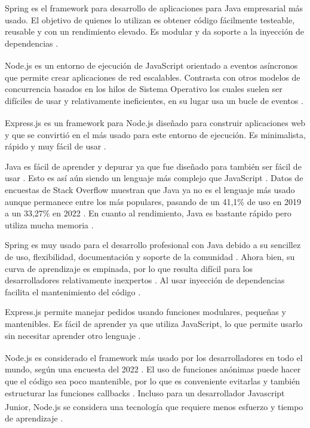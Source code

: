 \documentclass[twoside]{article}
\begin{document}
Spring es el framework para desarrollo de aplicaciones para Java empresarial más usado. El objetivo de quienes lo utilizan es obtener código fácilmente testeable, reusable y con un rendimiento elevado. Es modular y da soporte a la inyección de dependencias \parencite{tutorialspointSpring}.

Node.js\textsuperscript{\textregistered} es un entorno de ejecución de JavaScript orientado a eventos asíncronos que permite crear aplicaciones de red escalables. Contrasta con otros modelos de concurrencia basados en los hilos de Sistema Operativo los cuales suelen ser difíciles de usar y relativamente ineficientes, en su lugar usa un bucle de eventos \parencite{aboutNode}.

Express.js es un framework para Node.js\textsuperscript{\textregistered} diseñado para construir aplicaciones web y que se convirtió en el más usado para este entorno de ejecución. Es minimalista, rápido y muy fácil de usar \parencite{kinstaExpress}.

Java es fácil de aprender y depurar ya que fue diseñado para también ser fácil de usar \parencite{ibmJava}. Esto es así aún siendo un lenguaje más complejo que JavaScript \parencite{lighthouselabsJavaVSJavscript}. Datos de encuestas de Stack Overflow muestran que Java ya no es el lenguaje más usado aunque permanece entre los más populares, pasando de un 41,1\% de uso en 2019 a un 33,27\% en 2022 \parencite{devmJava}. En cuanto al rendimiento, Java es bastante rápido pero utiliza mucha memoria \parencite{akkiJava}.

Spring es muy usado para el desarrollo profesional con Java debido a su sencillez de uso, flexibilidad, documentación y soporte de la comunidad \parencite{flexipleJava}. Ahora bien, su curva de aprendizaje es empinada, por lo que resulta difícil para los desarrolladores relativamente inexpertos \parencite{adservio}. Al usar inyección de dependencias facilita el mantenimiento del código \parencite{turingSpring}.

Express.js permite manejar pedidos usando funciones modulares, pequeñas y mantenibles. Es fácil de aprender ya que utiliza JavaScript, lo que permite usarlo sin necesitar aprender otro lenguaje \parencite{linuxhintExpress}. 

Node.js\textsuperscript{\textregistered} es considerado el framework más usado por los desarrolladores en todo el mundo, según una encuesta del 2022 \parencite{statistaFrameworks}. El uso de funciones anónimas puede hacer que el código sea poco mantenible, por lo que es conveniente evitarlas y también estructurar las funciones callbacks \parencite{packtpub}. Incluso para un desarrollador Javascript Junior, Node.js\textsuperscript{\textregistered} se considera una tecnología que requiere menos esfuerzo y tiempo de aprendizaje \parencite{simplilearnNode}.
\end{document}
